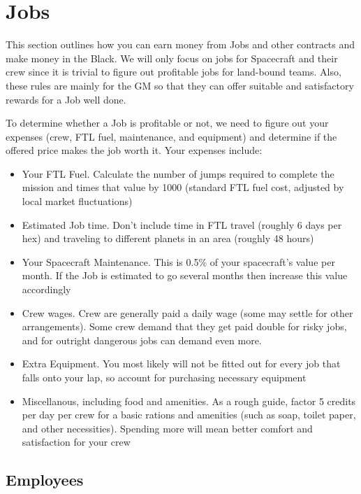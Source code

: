 
\section{Jobs}

\begin{multicols}{2}

  This section outlines how you can earn money from Jobs and other contracts and make money in the Black. We will only focus on jobs for Spacecraft and their crew since it is trivial to figure out profitable jobs for land-bound teams. Also, these rules are mainly for the GM so that they can offer suitable and satisfactory rewards for a Job well done.
  
  To determine whether a Job is profitable or not, we need to figure out your expenses (crew, FTL fuel, maintenance, and equipment) and determine if the offered price makes the job worth it. Your expenses include:
  
  \begin{itemize}
    \item Your FTL Fuel. Calculate the number of jumps required to complete the mission and times that value by 1000 (standard FTL fuel cost, adjusted by local market fluctuations)
    \item Estimated Job time. Don't include time in FTL travel (roughly 6 days per hex) and traveling to different planets in an area (roughly 48 hours) 
    \item Your Spacecraft Maintenance. This is 0.5\% of your spacecraft's value per month. If the Job is estimated to go several months then increase this value accordingly
    \item Crew wages. Crew are generally paid a daily wage (some may settle for other arrangements). Some crew demand that they get paid double for risky jobs, and for outright dangerous jobs can demand even more.
    \item Extra Equipment. You most likely will not be fitted out for every job that falls onto your lap, so account for purchasing necessary equipment
    \item Miscellanous, including food and amenities. As a rough guide, factor 5 credits per day per crew for a basic rations and amenities (such as soap, toilet paper, and other necessities). Spending more will mean better comfort and satisfaction for your crew
  \end{itemize}
  
  \subsection{Employees}


\end{multicols}
